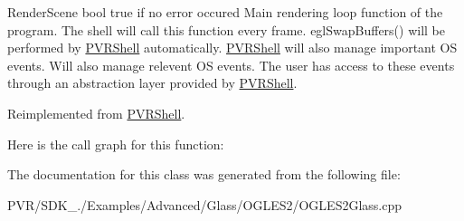   Render\+Scene  bool true if no error occured  Main rendering loop function of the program. The shell will call this function every frame. egl\+Swap\+Buffers() will be performed by \hyperlink{class_p_v_r_shell}{P\+V\+R\+Shell} automatically. \hyperlink{class_p_v_r_shell}{P\+V\+R\+Shell} will also manage important O\+S events. Will also manage relevent O\+S events. The user has access to these events through an abstraction layer provided by \hyperlink{class_p_v_r_shell}{P\+V\+R\+Shell}. 

Reimplemented from \hyperlink{class_p_v_r_shell_ae0eb5f797cbe993a22b8659f9c332578}{P\+V\+R\+Shell}.



Here is the call graph for this function\+:




The documentation for this class was generated from the following file\+:\begin{DoxyCompactItemize}
\item 
P\+V\+R/\+S\+D\+K\+\_./\+Examples/\+Advanced/\+Glass/\+O\+G\+L\+E\+S2/O\+G\+L\+E\+S2\+Glass.\+cpp\end{DoxyCompactItemize}
